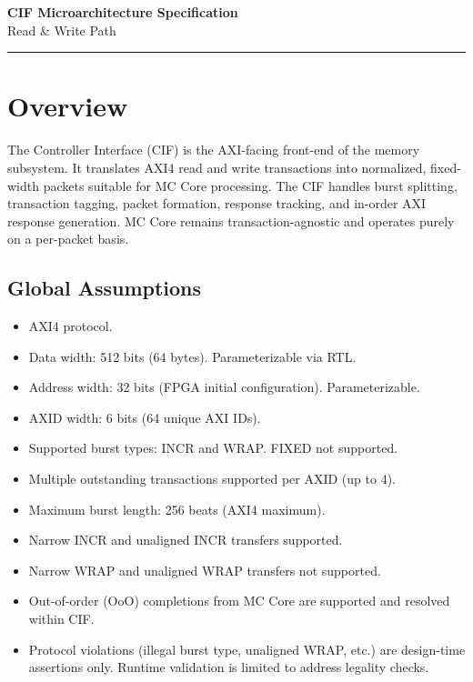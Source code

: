 \documentclass[11pt, a4paper]{article}
\begin{document}
\begin{center}
    {\LARGE \textbf{CIF Microarchitecture Specification}}\\[0.4em]
    {\large Read \& Write Path}\\[0.2em]
    \rule{\textwidth}{0.4pt}
\end{center}

\vspace{1em}

\section{Overview}

The Controller Interface (CIF) is the AXI-facing front-end of the memory subsystem. It translates AXI4 read and write transactions into normalized, fixed-width packets suitable for MC Core processing. The CIF handles burst splitting, transaction tagging, packet formation, response tracking, and in-order AXI response generation. MC Core remains transaction-agnostic and operates purely on a per-packet basis.

\subsection{Global Assumptions}

\begin{itemize}[noitemsep]
    \item AXI4 protocol.
    \item Data width: 512 bits (64 bytes). Parameterizable via RTL.
    \item Address width: 32 bits (FPGA initial configuration). Parameterizable.
    \item AXID width: 6 bits (64 unique AXI IDs).
    \item Supported burst types: INCR and WRAP. FIXED not supported.
    \item Multiple outstanding transactions supported per AXID (up to 4).
    \item Maximum burst length: 256 beats (AXI4 maximum).
    \item Narrow INCR and unaligned INCR transfers supported.
    \item Narrow WRAP and unaligned WRAP transfers not supported.
    \item Out-of-order (OoO) completions from MC Core are supported and resolved within CIF.
    \item Protocol violations (illegal burst type, unaligned WRAP, etc.) are design-time assertions only. Runtime validation is limited to address legality checks.
\end{itemize}
\end{document}
